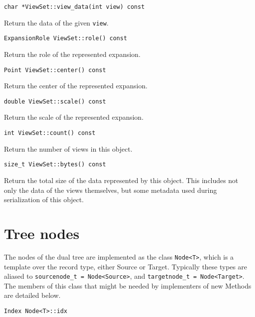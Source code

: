 \begin{lstlisting}
char *ViewSet::view_data(int view) const
\end{lstlisting}

\noindent Return the data of the given \texttt{view}.

\begin{lstlisting}
ExpansionRole ViewSet::role() const
\end{lstlisting}

\noindent Return the role of the represented expansion.

\begin{lstlisting}
Point ViewSet::center() const
\end{lstlisting}

\noindent Return the center of the represented expansion.

\begin{lstlisting}
double ViewSet::scale() const
\end{lstlisting}

\noindent Return the scale of the represented expansion.

\begin{lstlisting}
int ViewSet::count() const
\end{lstlisting}

\noindent Return the number of views in this object.

\begin{lstlisting}
size_t ViewSet::bytes() const
\end{lstlisting}

\noindent Return the total size of the data represented by this object. This
includes not only the data of the views themselves, but some metadata used
during serialization of this object.


\section{Tree nodes}

The nodes of the dual tree are implemented as the class \texttt{Node<T>}, which
is a template over the record type, either Source or Target. Typically these
types are aliased to \texttt{sourcenode\_t = Node<Source>}, and
\texttt{targetnode\_t = Node<Target>}. The members of this class that might be
needed by implementers of new Methods are detailed below.

\begin{lstlisting}
Index Node<T>::idx
\end{lstlisting}

